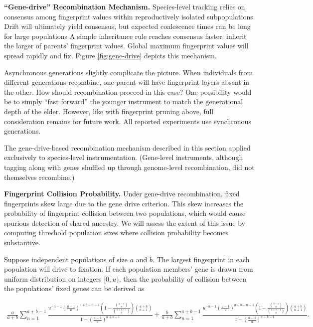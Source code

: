 
\textbf{``Gene-drive'' Recombination Mechanism.}
Species-level tracking relies on consensus among fingerprint values within reproductively isolated subpopulations.
Drift will ultimately yield consensus, but expected coalescence times can be long for large populations
A simple inheritance rule reaches consensus faster: inherit the larger of parents' fingerprint values.
Global maximum fingerprint values will spread rapidly and fix.
Figure \ref{fig:gene-drive} depicts this mechanism.

Asynchronous generations slightly complicate the picture.
When individuals from different generations recombine, one parent will have fingerprint layers absent in the other.
How should recombination proceed in this case?
One possibility would be to simply ``fast forward'' the younger instrument to match the generational depth of the elder.
However, like with fingerprint pruning above, full consideration remains for future work.
All reported experiments use synchronous generations.

The gene-drive-based recombination mechanism described in this section applied exclusively to species-level instrumentation.
(Gene-level instruments, although tagging along with genes shuffled up through genome-level recombination, did not themselves recombine.)

\textbf{Fingerprint Collision Probability.}
Under gene-drive recombination, fixed fingerprints skew large due to the gene drive criterion.
This skew increases the probability of fingerprint collision between two populations, which would cause spurious detection of shared ancestry.
We will assess the extent of this issue by computing threshold population sizes where collision probability becomes substantive.

Suppose independent populations of size $a$ and $b$.
The largest fingerprint in each population will drive to fixation.
If each population members' gene is drawn from uniform distribution on integers $[0, u)$, then the probability of collision between the populations' fixed genes can be derived as

\begin{scriptsize}
\begin{align*}
\frac{a}{a + b}\sum_{n=1}^{a + b - 1} \frac{u^{- n - 1} \left(\frac{u - 1}{u}\right)^{a + b - n - 1} \left(1 - \frac{{\binom{a - 1}{n}}}{{\binom{a + b - 1}{n}}} \right) {\binom{a + b}{n + 1}}}{1 - \left(\frac{u - 1}{u}\right)^{a + b - 1}}
+ \frac{b}{a + b} \sum_{n=1}^{a + b - 1} \frac{u^{- n - 1} \left(\frac{u - 1}{u}\right)^{a + b - n - 1} \left(1 - \frac{{\binom{b - 1}{n}}}{{\binom{a + b - 1}{n}}} \right) {\binom{a + b}{n + 1}}}{1 - \left(\frac{u - 1}{u}\right)^{a + b - 1}}.
\end{align*}
\end{scriptsize}

